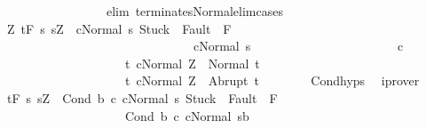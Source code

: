 \begin{isabellebody}
\ \ \ \ \ \ \ \ \ \ \ \ \ \ \ \ \ elim{\isacharcolon}\ terminates{\isacharunderscore}Normal{\isacharunderscore}elim{\isacharunderscore}cases{\isacharparenright}\isanewline
\ \ \isamarkupfalse%
\isanewline
\ \ \isamarkupfalse%
\ {\isachardoublequoteopen}{\isasymforall}Z{\isachardot}\ {\isasymGamma}{\isacharcomma}{\isasymTheta}{\isasymturnstile}\isactrlsub t\isactrlbsub {\isacharslash}F\isactrlesub \ {\isacharbraceleft}s{\isachardot}\ s{\isacharequal}Z\ {\isasymand}\ {\isasymGamma}{\isasymturnstile}{\isasymlangle}c{}{\isacharcomma}Normal\ s{\isasymrangle}\ {\isasymRightarrow}{\isasymnotin}{\isacharparenleft}{\isacharbraceleft}Stuck{\isacharbraceright}\ {\isasymunion}\ Fault\ {\isacharbackquote}\ {\isacharparenleft}{\isacharminus}F{\isacharparenright}{\isacharparenright}\ {\isasymand}\ \isanewline
\ \ \ \ \ \ \ \ \ \ \ \ \ \ \ \ \ \ \ \ \ \ \ \ \ \ \ \ \ \ \ {\isasymGamma}{\isasymturnstile}c{}{\isasymdown}Normal\ s{\isacharbraceright}\ \isanewline
\ \ \ \ \ \ \ \ \ \ \ \ \ \ \ \ \ \ \ \ \ \ c{}\ \isanewline
\ \ \ \ \ \ \ \ \ \ \ \ \ \ \ \ \ \ \ \ {\isacharbraceleft}t{\isachardot}\ {\isasymGamma}{\isasymturnstile}{\isasymlangle}c{}{\isacharcomma}Normal\ Z{\isasymrangle}\ {\isasymRightarrow}\ Normal\ t{\isacharbraceright}{\isacharcomma}\isanewline
\ \ \ \ \ \ \ \ \ \ \ \ \ \ \ \ \ \ \ \ {\isacharbraceleft}t{\isachardot}\ {\isasymGamma}{\isasymturnstile}{\isasymlangle}c{}{\isacharcomma}Normal\ Z{\isasymrangle}\ {\isasymRightarrow}\ Abrupt\ t{\isacharbraceright}{\isachardoublequoteclose}\ \ \isanewline
\ \ \ \ \isamarkupfalse%
\ Cond{\isachardot}hyps\ \isamarkupfalse%
\ iprover\ \ \isanewline
\ \ \isamarkupfalse%
\ {\isachardoublequoteopen}{\isasymGamma}{\isacharcomma}{\isasymTheta}{\isasymturnstile}\isactrlsub t\isactrlbsub {\isacharslash}F\isactrlesub \ {\isacharparenleft}{\isacharbraceleft}s{\isachardot}\ s{\isacharequal}Z\ {\isasymand}\ {\isasymGamma}{\isasymturnstile}{\isasymlangle}Cond\ b\ c{}\ c{}{\isacharcomma}Normal\ s{\isasymrangle}\ {\isasymRightarrow}{\isasymnotin}{\isacharparenleft}{\isacharbraceleft}Stuck{\isacharbraceright}\ {\isasymunion}\ Fault\ {\isacharbackquote}\ {\isacharparenleft}{\isacharminus}F{\isacharparenright}{\isacharparenright}\ {\isasymand}\ \isanewline
\ \ \ \ \ \ \ \ \ \ \ \ \ \ \ \ \ \ \ \ {\isasymGamma}{\isasymturnstile}{\isacharparenleft}Cond\ b\ c{}\ c{}{\isacharparenright}{\isasymdown}Normal\ s{\isacharbraceright}{\isasyminter}{\isacharminus}b{\isacharparenright}\ \isanewline

\end{isabellebody}
